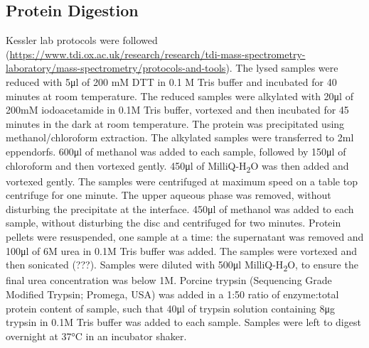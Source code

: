 \subsection{Protein Digestion}
Kessler lab protocols were followed (\url{https://www.tdi.ox.ac.uk/research/research/tdi-mass-spectrometry-laboratory/mass-spectrometry/protocols-and-tools}).
The lysed samples were reduced with 5\si{\ul} of 200 mM DTT in 0.1 M Tris buffer and incubated for 40 minutes at room temperature. The reduced samples were alkylated with 20\si{\ul} of 200mM iodoacetamide in 0.1M Tris buffer, vortexed and then incubated for 45 minutes in the dark at room temperature.
The protein was precipitated using methanol/chloroform extraction. The alkylated samples were transferred to 2ml eppendorfs. 600\si{\ul} of methanol was added to each sample, followed by 150\si{\ul} of chloroform and then vortexed gently. 450\si{\ul} of MilliQ-H\textsubscript{2}O was then added and vortexed gently. The samples were centrifuged at maximum speed on a table top centrifuge for one minute. The upper aqueous phase was removed, without disturbing the precipitate at the interface. 450\si{\ul} of methanol was added to each sample, without disturbing the disc and centrifuged for two minutes. Protein pellets were resuspended, one sample at a time: the supernatant was removed and 100\si{\ul} of 6M urea in 0.1M Tris buffer was added. The samples were vortexed and then sonicated (???). Samples were diluted with 500\si{\ul} MilliQ-H\textsubscript{2}O, to ensure the final urea concentration was below 1M. Porcine trypsin (Sequencing Grade Modified Trypsin; Promega, USA) was added in a 1:50 ratio of enzyme:total protein content of sample, such that 40\si{\ul} of trypsin solution containing 8\si{\ug} trypsin in 0.1M Tris buffer was added to each sample. Samples were left to digest overnight at 37\si{\degreeCelsius} in an incubator shaker.

